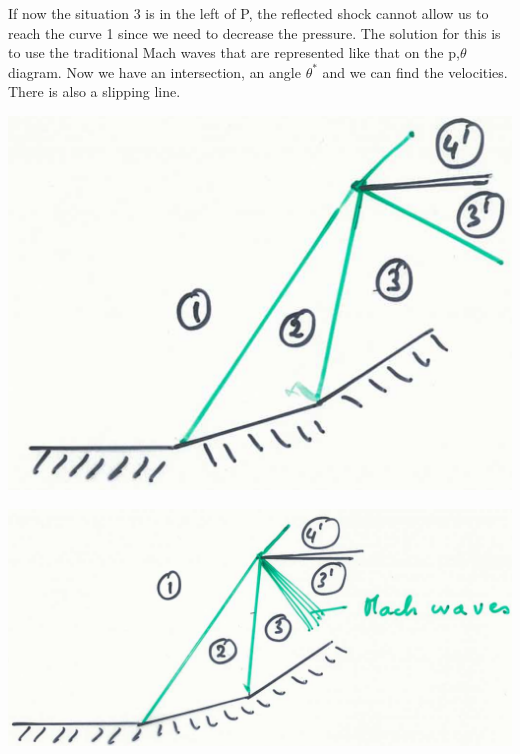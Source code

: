 If now the situation 3 is in the left of P, the reflected shock cannot allow us to reach the curve 1 since we need to decrease the pressure. The solution for this is to use the traditional Mach waves that are represented like that on the p,$\theta$ diagram. Now we have an intersection, an angle $\theta ^*$ and we can find the velocities. There is also a slipping line. 

\begin{center}
\begin{minipage}{0.33\textwidth}
\includegraphics[scale=0.2]{ch9/22}
\end{minipage}
\begin{minipage}{0.4\textwidth}
\includegraphics[scale=0.2]{ch9/23}
\end{minipage}
\end{center}

\begin{center}
\end{center}